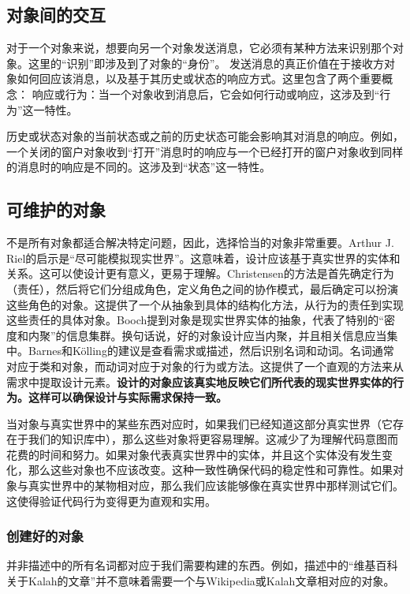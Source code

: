 \subsection{对象间的交互}
对于一个对象来说，想要向另一个对象发送消息，它必须有某种方法来识别那个对象。这里的“识别”即涉及到了对象的“身份”。
发送消息的真正价值在于接收方对象如何回应该消息，以及基于其历史或状态的响应方式。这里包含了两个重要概念：
响应或行为：当一个对象收到消息后，它会如何行动或响应，这涉及到“行为”这一特性。

历史或状态对象的当前状态或之前的历史状态可能会影响其对消息的响应。例如，一个关闭的窗户对象收到“打开”消息时的响应与一个已经打开的窗户对象收到同样的消息时的响应是不同的。这涉及到“状态”这一特性。

\subsection{可维护的对象}
不是所有对象都适合解决特定问题，因此，选择恰当的对象非常重要。Arthur J. Riel的启示是“尽可能模拟现实世界”。这意味着，设计应该基于真实世界的实体和关系。这可以使设计更有意义，更易于理解。Christensen的方法是首先确定行为（责任），然后将它们分组成角色，定义角色之间的协作模式，最后确定可以扮演这些角色的对象。这提供了一个从抽象到具体的结构化方法，从行为的责任到实现这些责任的具体对象。Booch提到对象是现实世界实体的抽象，代表了特别的“密度和内聚”的信息集群。换句话说，好的对象设计应当内聚，并且相关信息应当集中。Barnes和Kölling的建议是查看需求或描述，然后识别名词和动词。名词通常对应于类和对象，而动词对应于对象的行为或方法。这提供了一个直观的方法来从需求中提取设计元素。\textbf{设计的对象应该真实地反映它们所代表的现实世界实体的行为。这样可以确保设计与实际需求保持一致。}

当对象与真实世界中的某些东西对应时，如果我们已经知道这部分真实世界（它存在于我们的知识库中），那么这些对象将更容易理解。这减少了为理解代码意图而花费的时间和努力。如果对象代表真实世界中的实体，并且这个实体没有发生变化，那么这些对象也不应该改变。这种一致性确保代码的稳定性和可靠性。如果对象与真实世界中的某物相对应，那么我们应该能够像在真实世界中那样测试它们。这使得验证代码行为变得更为直观和实用。

\subsubsection{创建好的对象}

并非描述中的所有名词都对应于我们需要构建的东西。例如，描述中的“维基百科关于Kalah的文章”并不意味着需要一个与Wikipedia或Kalah文章相对应的对象。

